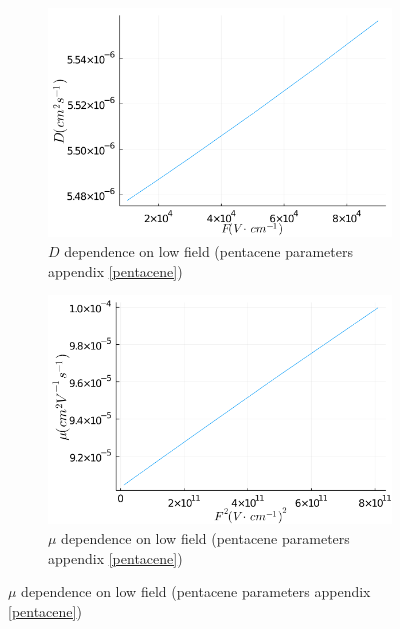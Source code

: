 \begin{figure}[htbp]
    \centering
    \begin{subfigure}[t]{0.49\textwidth}
        \centering
        \includegraphics*[width=\textwidth]{figures/3_elec/d_field_low.png}
        \caption{$D$ dependence on low field (pentacene parameters appendix \ref{pentacene})\label{fig:3_13}}
    \end{subfigure}
    \begin{subfigure}[t]{0.49\textwidth}
        \centering
        \includegraphics*[width=\textwidth]{figures/3_elec/mobi_field_low_square.png}
        \caption{$\mu$ dependence on low field (pentacene parameters appendix \ref{pentacene})\label{fig:3_14}}
    \end{subfigure}
\end{figure}

